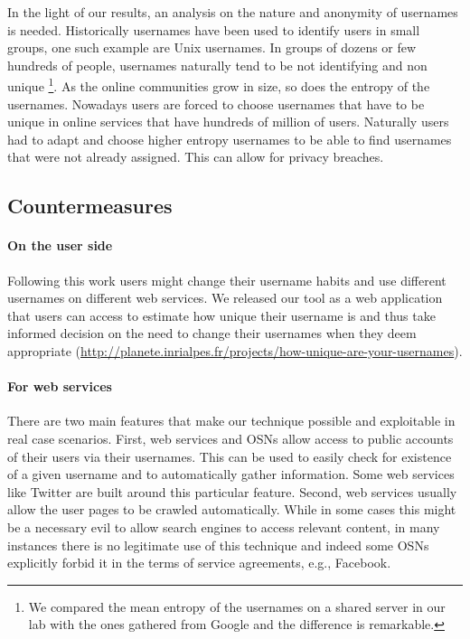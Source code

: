 \documentclass[letterpaper]{sig-alternate}
\begin{document}
In the light of our results, an analysis on the nature and anonymity of
usernames is needed. Historically usernames have been used to identify users in
small groups, one such example are Unix usernames. In groups of dozens or few hundreds of
people, usernames naturally tend to be not identifying and non unique \footnote{
We compared the mean entropy of the usernames on a shared server in our
lab with the ones gathered from Google and the difference is remarkable.}.
As the online communities grow in size, so does the entropy of the
usernames.  Nowadays users are forced to choose usernames that have to be
unique in online services that have hundreds of million of users. Naturally users had
to adapt and choose higher entropy usernames to be able to find usernames
that were not already assigned. This can allow for privacy breaches.




\subsection{Countermeasures}

\paragraph{On the user side}

Following this work users might change their username habits and use different
usernames on different web services.  We released our tool as a web application
that users can access to estimate how unique their username is and thus take
informed decision on the need to change their usernames when they deem
appropriate (\url{http://planete.inrialpes.fr/projects/how-unique-are-your-usernames}).

\paragraph{For web services}

There are two main features that make our technique possible and exploitable in real
case scenarios. First, web services and OSNs allow access to public accounts of their
users via their usernames. This can be used to easily check for existence of a given username
and to automatically gather information. Some web services like Twitter are built around
this particular feature.
Second, web services usually allow the user pages to be crawled automatically. While in some
cases this might be a necessary evil to allow search engines to access relevant content,
in many instances there is no legitimate use of this technique and indeed some OSNs explicitly 
forbid it in the terms of service agreements, e.g., Facebook.
\end{document}

